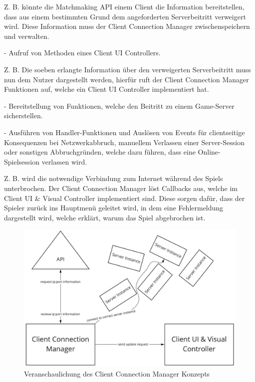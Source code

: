Z. B. könnte die Matchmaking API einem Client die Information bereitstellen, dass aus einem bestimmten Grund dem angeforderten Serverbeitritt verweigert wird. Diese Information muss der Client Connection Manager zwischenspeichern und verwalten.

- Aufruf von Methoden eines Client UI Controllers.

Z. B. Die soeben erlangte Information über den verweigerten Serverbeitritt muss nun dem Nutzer dargestellt werden, hierfür ruft der Client Connection Manager Funktionen auf, welche ein Client UI Controller implementiert hat.

- Bereitstellung von Funktionen, welche den Beitritt zu einem Game-Server sicherstellen.

- Ausführen von Handler-Funktionen und Auslösen von Events für clientseitige Konsequenzen bei Netzwerkabbruch, manuellem Verlassen einer Server-Session oder sonstigen Abbruchgründen, welche dazu führen, dass eine Online-Spielsession verlassen wird.

Z. B. wird die notwendige Verbindung zum Internet während des Spiels unterbrochen. Der Client Connection Manager löst Callbacks aus, welche im Client UI \& Visual Controller implementiert sind. Diese sorgen dafür, dass der Spieler zurück ins Hauptmenü geleitet wird, in dem eine Fehlermeldung dargestellt wird, welche erklärt, warum das Spiel abgebrochen ist.

\begin{figure}[H]
	\centering
	\includegraphics[width=150mm]{images/Client_Connection_Manager.jpg}
	\caption[Client Connection Manager Diagramm]{Veranschaulichung des Client Connection Manager Konzepts}
	\label{pic:Client_Connection_Manager}
\end{figure}

